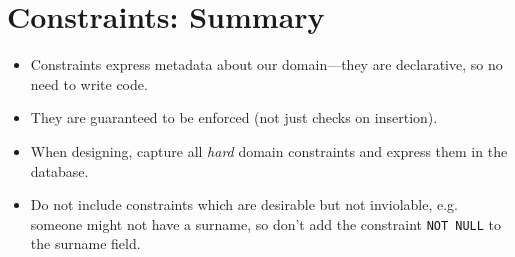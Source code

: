 \section{Constraints: Summary}
\begin{itemize}
	\item Constraints express metadata about our domain---they are declarative, so no need to write code.
	\item They are guaranteed to be enforced (not just checks on insertion).
	\item When designing, capture all \textit{hard} domain constraints and express them in the database.
	\item Do not include constraints which are desirable but not inviolable, e.g. someone might not have a surname, so don't add the constraint \verb|NOT NULL| to the surname field.
\end{itemize}









